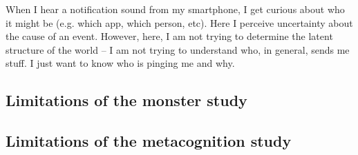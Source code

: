     When I hear a notification sound from my smartphone, I get curious about who it might be (e.g. which app, which person, etc). Here I perceive uncertainty about the cause of an event. However, here, I am not trying to determine the latent structure of the world -- I am not trying to understand who, in general, sends me stuff. I just want to know who is pinging me and why.

\subsection{Limitations of the monster study}

    

\subsection{Limitations of the metacognition study}

